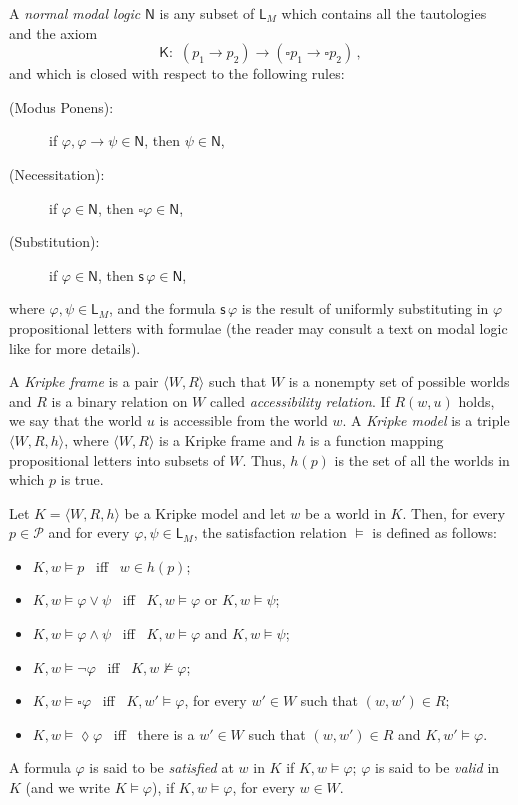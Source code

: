 \documentclass{fundam}
\renewcommand{\And}{\wedge}
\newcommand{\Or}{\vee}
\newcommand{\Kr}{\mathit{K}}
\newcommand{\K}{\mathsf{K}}
\begin{document}
A \emph{normal modal logic} $\mathsf{N}$ is any subset of $\mathsf{L}_{M}$
which contains all the tautologies and the axiom
$$
\K: \,\, (p_1 \rightarrow p_2) \rightarrow (\square p_1 \rightarrow \square p_2) \, ,
$$
and which is closed with respect to the following rules:
\begin{description}
\item [(Modus Ponens):] if $\varphi, \varphi \rightarrow \psi \in \mathsf{N}$, then $\psi \in \mathsf{N}$,
\item [(Necessitation):] if $\varphi \in \mathsf{N}$, then $\square \varphi \in \mathsf{N}$,
\item [(Substitution):] if $\varphi \in \mathsf{N}$, then $\mathsf{s}\, \varphi  \in \mathsf{N}$,
\end{description}
where $\varphi,\psi\in \mathsf{L}_{M}$, and the formula $\mathsf{s}\, \varphi$ is the result of uniformly substituting in $\varphi$ propositional letters with formulae (the reader may consult a text on modal logic like \cite{ModLog01} for more details).

A \emph{Kripke frame} is a pair $\langle W,R\rangle$ such that $W$ is
a nonempty set of possible worlds and $R$ is a binary relation on $W$
called \emph{accessibility relation}.  If $R(w,u)$ holds, we say that
the world $u$ is accessible from the world $w$.  A \emph{Kripke model}
is a triple $\langle W,R,h\rangle$, where $\langle W,R\rangle$ is a
Kripke frame and $h$ is a function mapping propositional letters into
subsets of $W$.  Thus, $h(p)$ is the set of all the worlds in which
$p$ is true.

Let $\Kr = \langle W,R,h\rangle$ be a Kripke model and let $w$ be a
world in $\Kr$. Then, for every $p \in \mathcal{P}$ and for every
$\varphi,\psi \in {\mathsf{L}_{M}}$, the satisfaction relation
$\models$ is defined as follows:
\begin{itemize}
\item $\Kr, w \models p$ ~iff~ $w \in h(p)$;

\item $\Kr, w \models \varphi \Or \psi$ ~iff~ $\Kr, w \models \varphi$ or $\Kr, w \models \psi$;

\item $\Kr, w \models \varphi \And \psi$ ~iff~ $\Kr, w \models \varphi$ and $\Kr, w \models \psi$;

\item $\Kr, w \models \neg \varphi$ ~iff~ $\Kr, w \not\models \varphi$;

\item $\Kr, w \models \square\varphi$ ~iff~ $\Kr, w' \models\varphi$,
for every $w'\in W$ such that $(w,w')\in R$;

\item $\Kr, w \models \lozenge\varphi$ ~iff~ there is a $w'\in W$ such that $(w,w')\in R$ and $\Kr, w' \models\varphi$.
\end{itemize}
A formula $\varphi$ is said to be \emph{satisfied} at $w$ in $\Kr$ if
$\Kr, w \models \varphi$; $\varphi$ is said to be \emph{valid} in
$\Kr$ (and we write $\Kr \models \varphi$), if $\Kr,w \models
\varphi$, for every $w \in W$.
\end{document}
